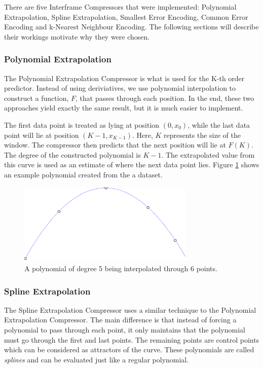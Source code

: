\documentclass[a4paper,11pt]{report}
\begin{document}
There are five Interframe Compressors that were implemented: Polynomial Extrapolation, Spline Extrapolation, Smallest Error Encoding, Common Error Encoding and k-Nearest Neighbour Encoding. The following sections will describe their workings motivate why they were chosen.

\subsubsection{Polynomial Extrapolation}

The Polynomial Extrapolation Compressor is what is used for the K-th order predictor. Instead of using deriviatives, we use polynomial interpolation to construct a function, $F$, that passes through each position. In the end, these two approaches yield exactly the same result, but it is much easier to implement.  

The first data point is treated as lying at position $(0, x_0)$, while the last data point will lie at position $(K-1, x_{K-1})$. Here, $K$ represents the size of the window.  The compressor then predicts that the next position will lie at $F(K)$. The degree of the constructed polynomial is $K-1$. The extrapolated value from this curve is used as an estimate of where the next data point lies. Figure \ref{PolyDescrip} shows an example polynomial created from the a dataset.

\begin{figure}
 \center
 \includegraphics[width=0.75\textwidth]{resources/PolynomialInterpolation.png}
\caption{A polynomial of degree 5 being interpolated through 6 points. }
\label{PolyDescrip}
\end{figure}

\subsubsection{Spline Extrapolation}

The Spline Extrapolation Compressor uses a similar technique to the Polynomial Extrapolation Compressor. The main difference is that instead of forcing a polynomial to pass through each point, it only maintains that the polynomial must go through the first and last points. The remaining points are control points which can be considered as attractors of the curve. These polynomials are called \emph{splines} and can be evaluated just like a regular polynomial.
\end{document}
